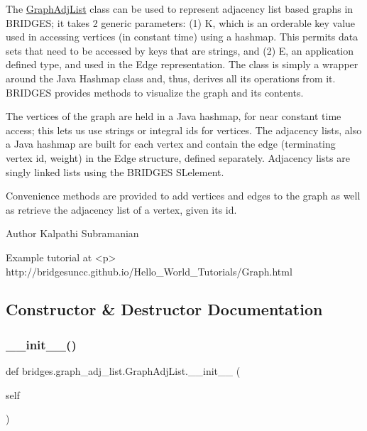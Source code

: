 The \mbox{\hyperlink{classbridges_1_1graph__adj__list_1_1_graph_adj_list}{Graph\+Adj\+List}} class can be used to represent adjacency list based graphs in B\+R\+I\+D\+G\+ES; it takes 2 generic parameters\+: (1) K, which is an orderable key value used in accessing vertices (in constant time) using a hashmap. This permits data sets that need to be accessed by keys that are strings, and (2) E, an application defined type, and used in the Edge representation. The class is simply a wrapper around the Java Hashmap class and, thus, derives all its operations from it. B\+R\+I\+D\+G\+ES provides methods to visualize the graph and its contents.

The vertices of the graph are held in a Java hashmap, for near constant time access; this lets us use strings or integral ids for vertices. The adjacency lists, also a Java hashmap are built for each vertex and contain the edge (terminating vertex id, weight) in the Edge structure, defined separately. Adjacency lists are singly linked lists using the B\+R\+I\+D\+G\+ES S\+Lelement.

Convenience methods are provided to add vertices and edges to the graph as well as retrieve the adjacency list of a vertex, given its id.

\begin{DoxyAuthor}{Author}
Kalpathi Subramanian
\end{DoxyAuthor}
\begin{DoxyVerb}\sa Example tutorial at <p>
    http://bridgesuncc.github.io/Hello_World_Tutorials/Graph.html\end{DoxyVerb}
 

\subsection{Constructor \& Destructor Documentation}
\mbox{\label{classbridges_1_1graph__adj__list_1_1_graph_adj_list_a8258a38ef234f4140b971e9fb7be7784}} 
\subsubsection{\texorpdfstring{\+\_\+\+\_\+init\+\_\+\+\_\+()}{\_\_init\_\_()}}
{\footnotesize\ttfamily def bridges.\+graph\+\_\+adj\+\_\+list.\+Graph\+Adj\+List.\+\_\+\+\_\+init\+\_\+\+\_\+ (\begin{DoxyParamCaption}\item[{}]{self }\end{DoxyParamCaption})}



